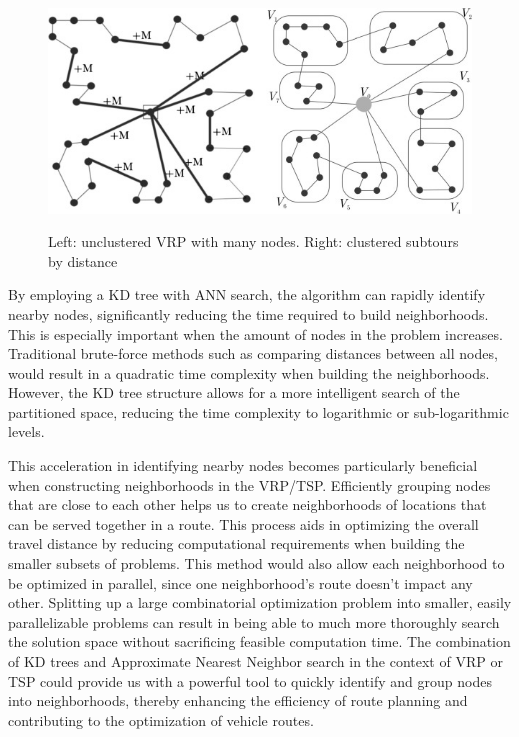 \documentclass{article}
\begin{document}
\begin{figure}[h]
    \centering
    \includegraphics[width=\textwidth,keepaspectratio]{Images/vrp_cluster.jpg}
    \label{fig:clustered_vrp}
    \caption{Left: unclustered VRP with many nodes. Right: clustered subtours by distance}
\end{figure}


By employing a KD tree with ANN search, the algorithm can rapidly identify nearby nodes, significantly reducing the time required to build neighborhoods. This is especially important when the amount of nodes in the problem increases. Traditional brute-force methods such as comparing distances between all nodes, would result in a quadratic time complexity when building the neighborhoods. However, the KD tree structure allows for a more intelligent search of the partitioned space, reducing the time complexity to logarithmic or sub-logarithmic levels.

This acceleration in identifying nearby nodes becomes particularly beneficial when constructing neighborhoods in the VRP/TSP. Efficiently grouping nodes that are close to each other helps us to create neighborhoods of locations that can be served together in a route. This process aids in optimizing the overall travel distance by reducing computational requirements when building the smaller subsets of problems. This method would also allow each neighborhood to be optimized in parallel, since one neighborhood's route doesn't impact any other. Splitting up a large combinatorial optimization problem into smaller, easily parallelizable problems can result in being able to much more thoroughly search the solution space without sacrificing feasible computation time. The combination of KD trees and Approximate Nearest Neighbor search in the context of VRP or TSP could provide us with a powerful tool to quickly identify and group nodes into neighborhoods, thereby enhancing the efficiency of route planning and contributing to the optimization of vehicle routes.

    \printbibliography
\end{document}
